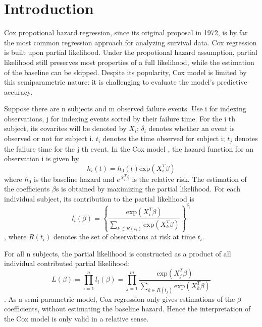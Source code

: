 \section{Introduction}
Cox propotional hazard regression, since its original proposal in 1972, is by far the most common regression approach for analyzing survival data. Cox regression is built upon partial likelihood. Under the propotional hazard assumption, partial likelihood still preserves most properties of a full likelihood, while the estimation of the baseline can be skipped. Despite its popularity, Cox model is limited by this semiparametric nature: it is challenging to evaluate the model's predictive accuracy.

Suppose there are n subjects and m observed failure events. Use i for indexing observations, j for indexing events sorted by their failure time. For the i th subject, its covarites will be denoted by $X_{i}$; $\delta_{i}$ denotes whether an event is observed or not for subject i. $t_{i}$ denotes the time observed for subject i; $t_{j}$ denotes the failure time for the j th event.  In the Cox model \citep{Cox1975}, the hazard function for an observation i is given by 
\begin{equation}h_{i}(t) = h_{0}(t) \text{exp}( X_{i}^{T} \beta)\end{equation} 
where $h_{0}$ is the baseline hazard and $e^{X_{i}^{T} \beta}$ is the relative risk. The estimation of the coefficients $\beta$s is obtained by maximizing the partial likelihood. For each individual subject, its contribution to the partial likelihood is 
\begin{equation} l_{i}(\beta) = \left \{\frac{\text{exp} ( X_{i}^{T} \beta)}{\sum_{ k \in R(t_{i})}\text{exp} ( X_{k}^{T} \beta)}\right \}^{\delta_{i}} \end{equation}  , where $R(t_{i})$ denotes the set of observations at risk at time $t_{i}$.

For all n subjects, the partial likelihood is constructed as a product of all individual contributed partial likelihood:
\begin{equation} L(\beta) =\prod_{i = 1}^{n} l_{i}(\beta) = \prod_{j=1}^{m} \frac{\text{exp} ( X_{j}^{T} \beta)}{\sum_{ k \in R(t_{j})}\text{exp} ( X_{k}^{T} \beta)}\end{equation}. As a semi-parametric model, Cox regression only gives estimations of the $\beta$ coefficients, without estimating the baseline hazard. Hence the interpretation of the Cox model is only valid in a relative sense.

